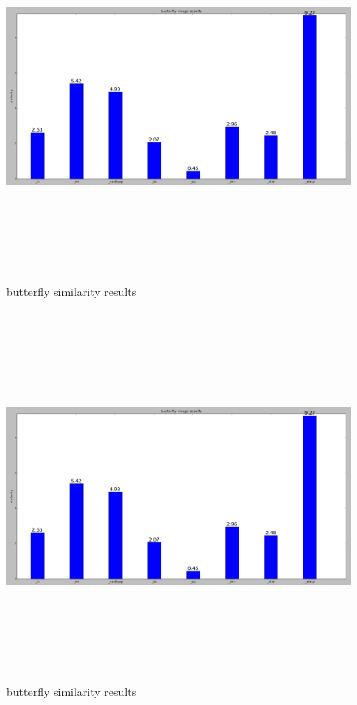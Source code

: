 		\begin{figure}[h] \label{bf_id}
			\includegraphics[width=\linewidth,height=12cm,keepaspectratio]{Figures/bf_id}
			\caption[butterfly similarity results]
			{butterfly similarity results}
		\end{figure}
		
		\begin{figure}[h] \label{bf_id}
			\includegraphics[width=\linewidth,height=12cm,keepaspectratio]{Figures/bf_id}
			\caption[butterfly similarity results]
			{butterfly similarity results}
		\end{figure}
		
